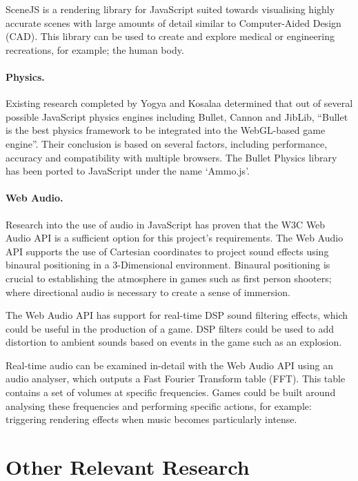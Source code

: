 SceneJS is a rendering library for JavaScript suited towards visualising highly accurate scenes with large amounts of detail similar to Computer-Aided Design (CAD). This library can be used to create and explore medical or engineering recreations, for example; the human body.\cite{scenejs}

\paragraph{Physics.}
Existing research completed by Yogya and Kosalaa determined that out of several possible JavaScript physics engines including Bullet, Cannon and JibLib, ``Bullet is the best physics framework to be integrated into the WebGL-based game engine''.\cite{yogya2014comparison} Their conclusion is based on several factors, including performance, accuracy and compatibility with multiple browsers. The Bullet Physics library has been ported to JavaScript under the name `Ammo.js'.

\paragraph{Web Audio.}
Research into the use of audio in JavaScript has proven that the W3C Web Audio API is a sufficient option for this project's requirements. The Web Audio API supports the use of Cartesian coordinates to project sound effects using binaural positioning in a 3-Dimensional environment.\cite{webaudio} Binaural positioning is crucial to establishing the atmosphere in games such as first person shooters; where directional audio is necessary to create a sense of immersion.

The Web Audio API has support for real-time DSP sound filtering effects, which could be useful in the production of a game. DSP filters could be used to add distortion to ambient sounds based on events in the game such as an explosion.

Real-time audio can be examined in-detail with the Web Audio API using an audio analyser, which outputs a Fast Fourier Transform table (FFT). This table contains a set of volumes at specific frequencies. Games could be built around analysing these frequencies and performing specific actions, for example: triggering rendering effects when music becomes particularly intense.

\section{Other Relevant Research}

